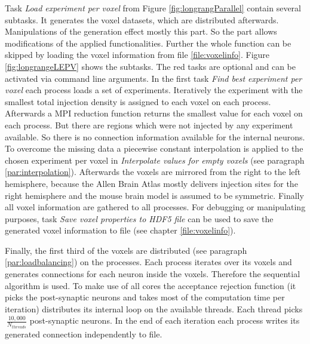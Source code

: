 Task \emph{Load experiment per voxel} from Figure \ref{fig:longrangParallel} contain several subtasks.
It generates the voxel datasets, which are distributed afterwards.
Manipulations of the generation effect mostly this part.
So the part allows modifications of the applied functionalities. 
Further the whole function can be skipped by loading the voxel information from file \ref{file:voxelinfo}.
Figure \ref{fig:longrangeLEPV} shows the subtasks.
The red tasks are optional and can be activated via command line arguments.
In the first task \emph{Find best experiment per voxel} each process loads a set of experiments.
Iteratively the experiment with the smallest total injection density is assigned to each voxel
on each process. Afterwards a MPI reduction function returns the smallest value for each voxel on
each process.
But there are regions which were not injected by any experiment available.
So there is no connection information available for the internal neurons.
To overcome the missing data a piecewise constant interpolation is applied to the chosen experiment per voxel
in \emph{Interpolate values for empty voxels} (see paragraph \ref{par:interpolation}).
Afterwards the voxels are mirrored from the right to the left hemisphere, because the
Allen Brain Atlas mostly delivers injection sites for the right hemisphere and
the mouse brain model is assumed to be symmetric.
Finally all voxel information are gathered to all processes.
For debugging or manipulating purposes, task \emph{Save voxel properties to HDF5 file} can be used
to save the generated voxel information to file (see chapter \ref{file:voxelinfo}).

Finally, the first third of the voxels are distributed (see paragraph \ref{par:loadbalancing}) on the processes.
Each process iterates over its voxels and generates connections for each neuron inside the voxels.
Therefore the sequential algorithm is used.
To make use of all cores the acceptance rejection function
(it picks the post-synaptic neurons and takes most of the computation time per iteration)
distributes its internal loop on the available threads.
Each thread picks $~ \frac{10,000}{N_{threads}}$ post-synaptic neurons.
In the end of each iteration each process writes its generated connection independently to file.


